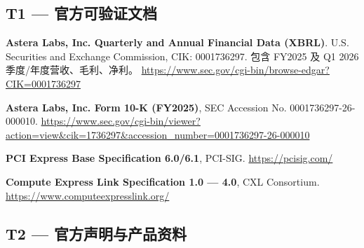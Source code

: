 
{}
\subsection*{T1 — 官方可验证文档}

\begin{enumerate}[label={[T1-\arabic*]}, leftmargin=*]

    \item \textbf{Astera Labs, Inc. Quarterly and Annual Financial Data (XBRL)}.
    U.S. Securities and Exchange Commission, CIK: 0001736297.
    包含 FY2025 及 Q1 2026 季度/年度营收、毛利、净利。
    \url{https://www.sec.gov/cgi-bin/browse-edgar?CIK=0001736297}

    \item \textbf{Astera Labs, Inc. Form 10-K (FY2025)}, SEC Accession No. 0001736297-26-000010.
    \url{https://www.sec.gov/cgi-bin/viewer?action=view&cik=1736297&accession_number=0001736297-26-000010}

    \item \textbf{PCI Express Base Specification 6.0/6.1}, PCI-SIG.
    \url{https://pcisig.com/}

    \item \textbf{Compute Express Link Specification 1.0 — 4.0}, CXL Consortium.
    \url{https://www.computeexpresslink.org/}

\end{enumerate}

{}
\subsection*{T2 — 官方声明与产品资料}


